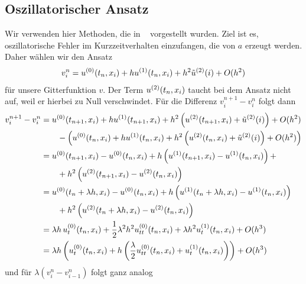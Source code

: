 \subsection{Oszillatorischer Ansatz}

Wir verwenden hier Methoden, die in ~\cite{Junk2004} vorgestellt wurden.
Ziel ist es, oszillatorische Fehler im Kurzzeitverhalten einzufangen, die von $a$ erzeugt werden.
Daher wählen wir den Ansatz
\begin{align}\label{eq:varadv:ansatz}
v^n_i = u^{(0)}(t_n, x_i) + h u^{(1)}(t_n, x_i) + h^2 \tilde u^{(2)}(i) + O(h^2)
\end{align}
für unsere Gitterfunktion $v$. 
Der Term $u^{(2)}(t_n, x_i)$ taucht bei dem Ansatz nicht auf, weil er hierbei zu Null verschwindet.
Für die Differenz $v^{n+1}_i - v^n_i$ folgt dann
\begin{align*}
v^{n+1}_i - v^n_i
&= u^{(0)}(t_{n+1}, x_i) + h u^{(1)}(t_{n+1}, x_i) + h^2 \left( u^{(2)}(t_{n+1}, x_i) + \tilde u^{(2)}(i) \right) + O(h^2)\\
   &\qquad - \left( u^{(0)}(t_n, x_i) + h u^{(1)}(t_n, x_i) + h^2 \left( u^{(2)}(t_n, x_i) + \tilde u^{(2)}(i)\right)  + O(h^2)\right)\\
&= u^{(0)}(t_{n+1}, x_i) - u^{(0)}(t_n, x_i) + h \left( u^{(1)}(t_{n+1}, x_i) - u^{(1)}(t_n, x_i)\right) + \\
   &\qquad + h^2 \left( u^{(2)}(t_{n+1}, x_i) - u^{(2)}(t_n, x_i) \right)\\
&= u^{(0)}(t_n + \lambda h, x_i) - u^{(0)}(t_n, x_i) + h \left( u^{(1)}(t_n + \lambda h, x_i) - u^{(1)}(t_n, x_i)\right)\\
   &\qquad + h^2 \left( u^{(2)}(t_n + \lambda h, x_i) - u^{(2)}(t_n, x_i) \right)\\
&= \lambda h \, u^{(0)}_t (t_n, x_i) + \frac 12 \lambda^2 h^2 u^{(0)}_{tt}(t_n, x_i) + \lambda h^2 u^{(1)}_t(t_n, x_i) + O(h^3)\\
&= \lambda h \left( u^{(0)}_t (t_n, x_i) + h \left( \frac \lambda 2 u^{(0)}_{tt}(t_n, x_i) + u^{(1)}_t(t_n, x_i) \right) \right) + O(h^3)
\end{align*}
und für $\lambda (v^n_{i} - v^n_{i-1})$ folgt ganz analog
